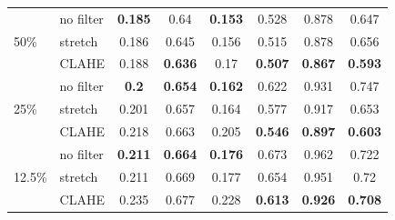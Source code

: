 \begin{table}[ht]
\begin{tabular}{rrcrrcrr}
    \multicolumn{1}{l}{\multirow{3}[2]{*}{50\%}} & \multicolumn{1}{l}{no filter} & \textbf{0.185} & \multicolumn{1}{c}{0.64} & \multicolumn{1}{c}{\textbf{0.153}} & 0.528 & \multicolumn{1}{c}{0.878} & \multicolumn{1}{c}{0.647} \\
    \multicolumn{1}{l}{} & \multicolumn{1}{l}{stretch} & 0.186 & \multicolumn{1}{c}{0.645} & \multicolumn{1}{c}{0.156} & 0.515 & \multicolumn{1}{c}{0.878} & \multicolumn{1}{c}{0.656} \\
    \multicolumn{1}{l}{} & \multicolumn{1}{l}{CLAHE} & 0.188 & \multicolumn{1}{c}{\textbf{0.636}} & \multicolumn{1}{c}{0.17} & \textbf{0.507} & \multicolumn{1}{c}{\textbf{0.867}} & \multicolumn{1}{c}{\textbf{0.593}} \\
    
     \midrule
     
    \multicolumn{1}{l}{\multirow{3}[2]{*}{25\%}} & \multicolumn{1}{l}{no filter} & \textbf{0.2} & \multicolumn{1}{c}{\textbf{0.654}} & \multicolumn{1}{c}{\textbf{0.162}} & 0.622 & \multicolumn{1}{c}{0.931} & \multicolumn{1}{c}{0.747} \\
    \multicolumn{1}{l}{} & \multicolumn{1}{l}{stretch} & 0.201 & \multicolumn{1}{c}{0.657} & \multicolumn{1}{c}{0.164} & 0.577 & \multicolumn{1}{c}{0.917} & \multicolumn{1}{c}{0.653} \\
    \multicolumn{1}{l}{} & \multicolumn{1}{l}{CLAHE} & 0.218 & \multicolumn{1}{c}{0.663} & \multicolumn{1}{c}{0.205} & \textbf{0.546} & \multicolumn{1}{c}{\textbf{0.897}} & \multicolumn{1}{c}{\textbf{0.603}} \\
     \midrule
    \multicolumn{1}{l}{\multirow{3}[2]{*}{12.5\%}} & \multicolumn{1}{l}{no filter} & \textbf{0.211} & \multicolumn{1}{c}{\textbf{0.664}} & \multicolumn{1}{c}{\textbf{0.176}} & 0.673 & \multicolumn{1}{c}{0.962} & \multicolumn{1}{c}{0.722} \\
    \multicolumn{1}{l}{} & \multicolumn{1}{l}{stretch} & 0.211 & \multicolumn{1}{c}{0.669} & \multicolumn{1}{c}{0.177} & 0.654 & \multicolumn{1}{c}{0.951} & \multicolumn{1}{c}{0.72} \\
    \multicolumn{1}{l}{} & \multicolumn{1}{l}{CLAHE} & 0.235 & \multicolumn{1}{c}{0.677} & \multicolumn{1}{c}{0.228} & \textbf{0.613} & \multicolumn{1}{c}{\textbf{0.926}} & \multicolumn{1}{c}{\textbf{0.708}} \\
    \bottomrule
    \end{tabular}%
  \label{tab:exp_contrast_filter}%
\end{table}%

